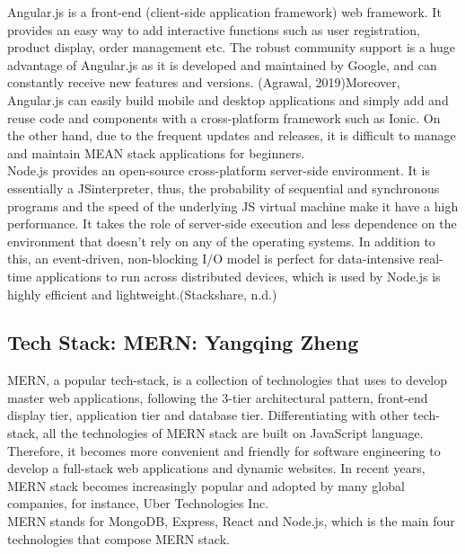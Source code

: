 \documentclass[a4paper, 11pt]{report}
\begin{document}
\noindent Angular.js is a front-end (client-side application framework) web framework. It provides an easy way to add interactive functions such as user registration, product display, order management etc. The robust community support is a huge advantage of Angular.js as it is developed and maintained by Google, and can constantly receive new features and versions. (Agrawal, 2019)Moreover, Angular.js can easily build mobile and desktop applications and simply add and reuse code and components with a cross-platform framework such as Ionic. On the other hand, due to the frequent updates and releases, it is difficult to manage and maintain MEAN stack applications for beginners.\\

\noindent Node.js provides an open-source cross-platform server-side environment. It is essentially a JSinterpreter, thus, the probability of sequential and synchronous programs and the speed of the underlying JS virtual machine make it have a high performance. It takes the role of server-side execution and less dependence on the environment that doesn’t rely on any of the operating systems. In addition to this, an event-driven, non-blocking I/O model is perfect for data-intensive real-time applications to run across distributed devices, which is used by Node.js is highly efficient and lightweight.(Stackshare, n.d.)\\

\subsection{Tech Stack: MERN: Yangqing Zheng}

\noindent MERN, a popular tech-stack, is a collection of technologies that uses to develop master web applications, following the 3-tier architectural pattern, front-end display tier, application tier and database tier. Differentiating with other tech-stack, all the technologies of MERN stack are built on JavaScript language. Therefore, it becomes more convenient and friendly for software engineering to develop a full-stack web applications and dynamic websites. In recent years, MERN stack becomes increasingly popular and adopted by many global companies, for instance, Uber Technologies Inc.\\

\noindent MERN stands for MongoDB, Express, React and Node.js, which is the main four technologies that compose MERN stack.\\
\end{document}
